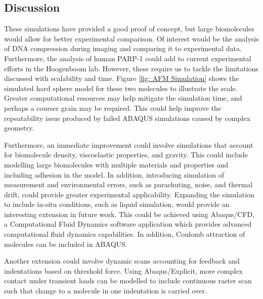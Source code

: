 \subsection{Discussion}

These simulations have provided a good proof of concept, but large biomolecules would allow for better experimental comparison. Of interest would be the analysis of DNA compression during imaging and comparing it to experimental data. Furthermore, the analysis of human PARP-1 could add to current experimental efforts in the Hoogenboom lab. However, these require us to tackle the limitations discussed with scalability and time. Figure \ref{fig: AFM Simulation} shows the simulated hard sphere model for these two molecules to illustrate the scale. Greater computational resources may help mitigate the simulation time, and perhaps a courser grain may be required. This could help improve the repeatability issue produced by failed ABAQUS simulations caused by complex geometry.

Furthermore, an immediate improvement could involve simulations that account for biomolecule density, viscoelastic properties, and gravity. This could include modelling large biomolecules with multiple materials and properties and including adhesion in the model. In addition, introducing simulation of measurement and environmental errors, such as parachuting, noise, and thermal drift, could provide greater experimental applicability. Expanding the simulation to include in-situ conditions, such as liquid simulation, would provide an interesting extension in future work. This could be achieved using Abaqus/CFD, a Computational Fluid Dynamics software application which provides advanced computational fluid dynamics capabilities. In addition, Coulomb attraction of molecules can be included in ABAQUS. 

Another extension could involve dynamic scans accounting for feedback and indentations based on threshold force. Using Abaqus/Explicit, more complex contact under transient loads can be modelled to include continuous raster scan such that change to a molecule in one indentation is carried over. 

